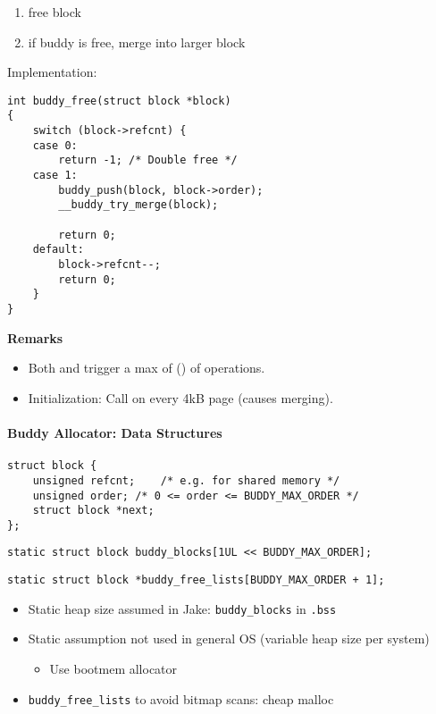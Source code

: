 \newpar{}
\begin{enumerate}
    \item free block
    \item if buddy is free, merge into larger block
\end{enumerate}

Implementation:
\begin{lstlisting}[style=bright_C++]
int buddy_free(struct block *block)
{
    switch (block->refcnt) {
    case 0:
        return -1; /* Double free */
    case 1:
        buddy_push(block, block->order);
        __buddy_try_merge(block);

        return 0;
    default:
        block->refcnt--;
        return 0;
    }
}
\end{lstlisting}

\textbf{Remarks}
\begin{itemize}
    \item Both  and  trigger a max of () of operations. %
    \item Initialization: Call  on every 4kB page (causes merging).
\end{itemize}

\paragraph{Buddy Allocator: Data Structures}
\begin{lstlisting}[style=bright_C++]
struct block {
    unsigned refcnt;    /* e.g. for shared memory */
    unsigned order; /* 0 <= order <= BUDDY_MAX_ORDER */
    struct block *next;
};
\end{lstlisting}
\newpar{}
\begin{lstlisting}[style=bright_C++]
static struct block buddy_blocks[1UL << BUDDY_MAX_ORDER];
\end{lstlisting}

\begin{lstlisting}[style=bright_C++]
static struct block *buddy_free_lists[BUDDY_MAX_ORDER + 1];
\end{lstlisting}

\newpar{}
\begin{itemize}
    \item Static heap size assumed in Jake: \texttt{buddy\_blocks} in \texttt{.bss}
    \item Static assumption not used in general OS (variable heap size per system)
    \begin{itemize}
        \item Use bootmem allocator
    \end{itemize}
    \item \texttt{buddy\_free\_lists} to avoid bitmap scans: cheap malloc
\end{itemize}

